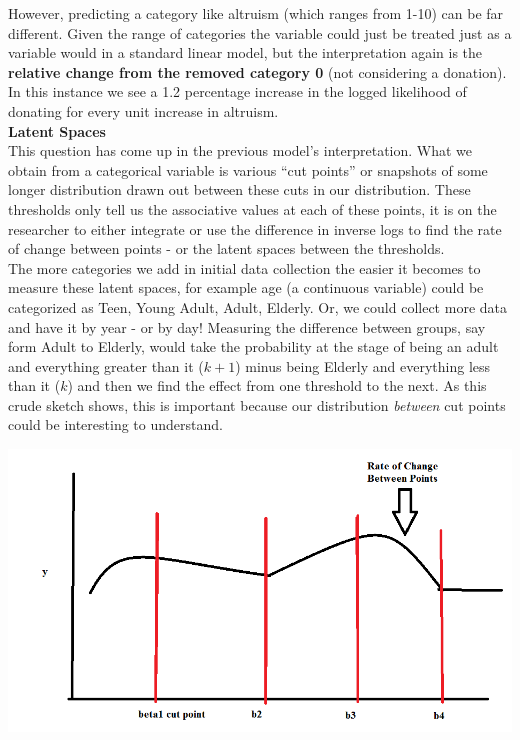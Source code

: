\documentclass[12pt]{article}\usepackage[]{graphicx}\usepackage[]{color}
\begin{document}
\begin{flushleft}
However, predicting a category like altruism (which ranges from 1-10) can be far different. Given the range of categories the variable could just be treated just as a variable would in a standard linear model, but the interpretation again is the \textbf{relative change from the removed category 0} (not considering a donation). In this instance we see a 1.2 percentage increase in the logged likelihood of donating for every unit increase in altruism. \\

\noindent \textbf{Latent Spaces}\\
This question has come up in the previous model's interpretation. What we obtain from a categorical variable is various ``cut points'' or snapshots of some longer distribution drawn out between these cuts in our distribution. These thresholds only tell us the associative values at each of these points, it is on the researcher to either integrate or use the difference in inverse logs to find the rate of change between points - or the latent spaces between the thresholds. \\
The more categories we add in initial data collection the easier it becomes to measure these latent spaces, for example age (a continuous variable) could be categorized as Teen, Young Adult, Adult, Elderly. Or, we could collect more data and have it by year - or by day! Measuring the difference between groups, say form Adult to Elderly, would take the probability at the stage of being an adult and everything greater than it ($k+1$) minus being Elderly and everything less than it ($k$) and then we find the effect from one threshold to the next. As this crude sketch shows, this is important because our distribution \textit{between} cut points could be interesting to understand.\\

\begin{center}
\includegraphics[scale=.65]{yeah}
\end{center}









\end{flushleft}
\end{document}
